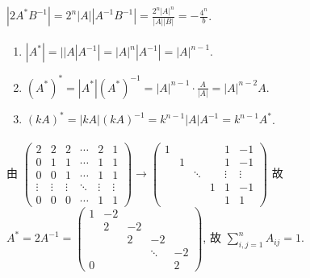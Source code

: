 	\paragraph{} %
		$|2A^*B^{-1}| = 2^n|A||A^{-1}B^{-1}| = \frac{2^n|A|^n}{|A||B|} = -\frac{4^n}{b}$.


	\paragraph{} %
		\begin{enumerate}
			\item %
			      $|A^*| = ||A|A^{-1}| = |A|^n|A^{-1}| = |A|^{n-1}$.

			\item %
			      $(A^*)^* = |A^*|(A^*)^{-1} = |A|^{n-1} \cdot \frac{A}{|A|} = |A|^{n-2}A$.

			\item %
			      $(kA)^* = |kA|(kA)^{-1} = k^{n-1}|A|A^{-1} = k^{n-1}A^*$.
		\end{enumerate}


	\paragraph{} %
		由 $\begin{pmatrix}
				2      & 2      & 2      & \cdots & 2      & 1      \\
				0      & 1      & 1      & \cdots & 1      & 1      \\
				0      & 0      & 1      & \cdots & 1      & 1      \\
				\vdots & \vdots & \vdots & \ddots & \vdots & \vdots \\
				0      & 0      & 0      & \cdots & 1      & 1
			\end{pmatrix} \to \begin{pmatrix}
				1 &   &        &   & 1      & -1     \\
				  & 1 &        &   & 1      & -1     \\
				  &   & \ddots &   & \vdots & \vdots \\
				  &   &        & 1 & 1      & -1     \\
				  &   &        &   & 1      & 1
			\end{pmatrix}$
		故 $A^* = 2A^{-1} = \begin{pmatrix}
				1 & -2 &    &        &    \\
				  & 2  & -2 &        &    \\
				  &    & 2  & -2     &    \\
				  &    &    & \ddots & -2 \\
				0 &    &    &        & 2
			\end{pmatrix}$, 故 $\sum_{i,j=1}^{n} A_{ij} = 1$.


